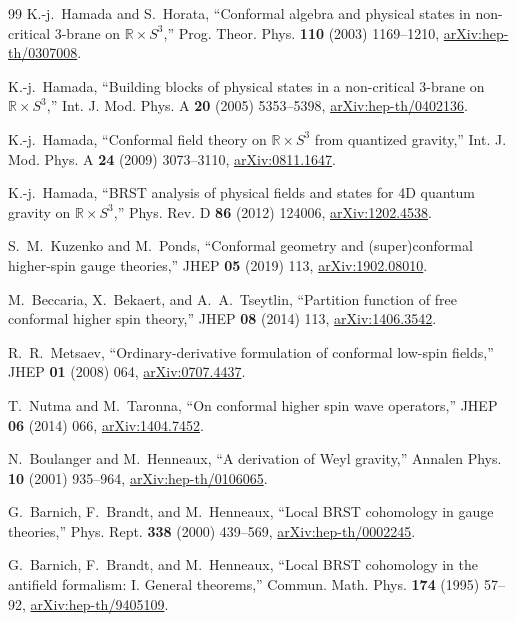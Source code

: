 \documentclass[11pt]{article}
\theoremstyle{definition}
\theoremstyle{remark}
\newcommand{\R}{\mathbb R}
\begin{document}
\begin{thebibliography}{99}
K.-j.~Hamada and S.~Horata,
``Conformal algebra and physical states in non-critical 3-brane on
$\R\times S^3$,''
Prog. Theor. Phys. \textbf{110} (2003) 1169--1210,
\href{https://arxiv.org/abs/hep-th/0307008}{arXiv:hep-th/0307008}.

K.-j.~Hamada,
``Building blocks of physical states in a non-critical 3-brane on
$\R\times S^3$,''
Int. J. Mod. Phys. A \textbf{20} (2005) 5353--5398,
\href{https://arxiv.org/abs/hep-th/0402136}{arXiv:hep-th/0402136}.

K.-j.~Hamada,
``Conformal field theory on $\R\times S^3$ from quantized gravity,''
Int. J. Mod. Phys. A \textbf{24} (2009) 3073--3110,
\href{https://arxiv.org/abs/0811.1647}{arXiv:0811.1647}.

K.-j.~Hamada,
``BRST analysis of physical fields and states for 4D quantum gravity on
$\R\times S^3$,''
Phys. Rev. D \textbf{86} (2012) 124006,
\href{https://arxiv.org/abs/1202.4538}{arXiv:1202.4538}.

S.~M.~Kuzenko and M.~Ponds,
``Conformal geometry and (super)conformal higher-spin gauge theories,''
JHEP \textbf{05} (2019) 113,
\href{https://arxiv.org/abs/1902.08010}{arXiv:1902.08010}.

M.~Beccaria, X.~Bekaert, and A.~A.~Tseytlin,
``Partition function of free conformal higher spin theory,''
JHEP \textbf{08} (2014) 113,
\href{https://arxiv.org/abs/1406.3542}{arXiv:1406.3542}.

R.~R.~Metsaev,
``Ordinary-derivative formulation of conformal low-spin fields,''
JHEP \textbf{01} (2008) 064,
\href{https://arxiv.org/abs/0707.4437}{arXiv:0707.4437}.

T.~Nutma and M.~Taronna,
``On conformal higher spin wave operators,''
JHEP \textbf{06} (2014) 066,
\href{https://arxiv.org/abs/1404.7452}{arXiv:1404.7452}.

N.~Boulanger and M.~Henneaux,
``A derivation of Weyl gravity,''
Annalen Phys. \textbf{10} (2001) 935--964,
\href{https://arxiv.org/abs/hep-th/0106065}{arXiv:hep-th/0106065}.

G.~Barnich, F.~Brandt, and M.~Henneaux,
``Local BRST cohomology in gauge theories,''
Phys. Rept. \textbf{338} (2000) 439--569,
\href{https://arxiv.org/abs/hep-th/0002245}{arXiv:hep-th/0002245}.

G.~Barnich, F.~Brandt, and M.~Henneaux,
``Local BRST cohomology in the antifield formalism: I. General theorems,''
Commun. Math. Phys. \textbf{174} (1995) 57--92,
\href{https://arxiv.org/abs/hep-th/9405109}{arXiv:hep-th/9405109}.


\end{thebibliography}
\end{document}
